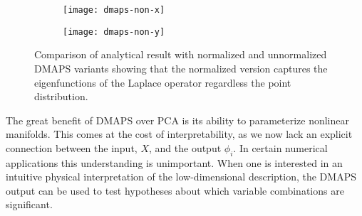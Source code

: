 \begin{figure}
  \centering
  \begin{subfigure}[t]{0.45\linewidth}
    \centering
    \texttt{[image: dmaps-non-x]}
  \end{subfigure}
  \begin{subfigure}[t]{0.45\linewidth}
    \centering
    \texttt{[image: dmaps-non-y]}
  \end{subfigure}
  \caption[Comparison of different DMAPS variants]{Comparison of analytical result with normalized and
    unnormalized DMAPS variants showing that the normalized version
    captures the eigenfunctions of the Laplace operator regardless the
    point distribution. \label{fig:dmaps-nonun-phi} }
\end{figure}

The great benefit of DMAPS over PCA is its ability to parameterize
nonlinear manifolds. This comes at the cost of interpretability, as we
now lack an explicit connection between the input, $X$, and the output
$\phi_i$. In certain numerical applications this understanding is
unimportant. When one is interested in an intuitive physical
interpretation of the low-dimensional description, the DMAPS output
can be used to test hypotheses about which variable combinations are
significant.


